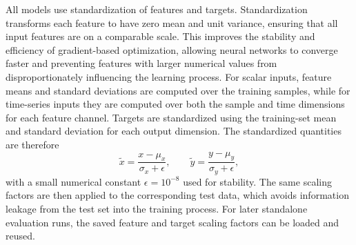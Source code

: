 All models use standardization of features and targets. Standardization transforms each feature to have zero mean and unit variance, ensuring that all input features are on a comparable scale. This improves the stability and efficiency of gradient-based optimization, allowing neural networks to converge faster and preventing features with larger numerical values from disproportionately influencing the learning process.\cite{lecun2012efficient}
For scalar inputs, feature means and standard deviations are computed over the training samples, while for time-series inputs they are computed over both the sample and time dimensions for each feature channel.
Targets are standardized using the training-set mean and standard deviation for each output dimension.
The standardized quantities are therefore
\begin{equation*}
    \tilde{x} = \frac{x-\mu_x}{\sigma_x+\epsilon}, \qquad \tilde{y} = \frac{y-\mu_y}{\sigma_y+\epsilon},
\end{equation*}
with a small numerical constant $\epsilon=10^{-8}$ used for stability.
The same scaling factors are then applied to the corresponding test data, which avoids information leakage from the test set into the training process.
For later standalone evaluation runs, the saved feature and target scaling factors can be loaded and reused.
